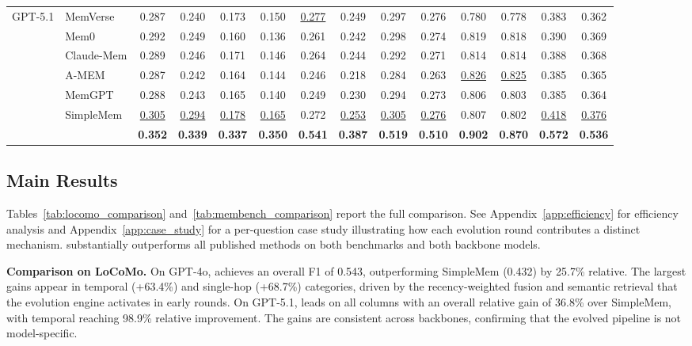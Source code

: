 \begin{table}[t]
{\begin{tabular}{ll cc cc cc cc cc cc}
\midrule
\multirow{7}{*}{GPT-5.1}
& MemVerse    & 0.287 & 0.240 & 0.173 & 0.150 & \underline{0.277} & 0.249 & 0.297 & 0.276 & 0.780 & 0.778 & 0.383 & 0.362 \\
& Mem0        & 0.292 & 0.249 & 0.160 & 0.136 & 0.261 & 0.242 & 0.298 & 0.274 & 0.819 & 0.818 & 0.390 & 0.369 \\
& Claude-Mem  & 0.289 & 0.246 & 0.171 & 0.146 & 0.264 & 0.244 & 0.292 & 0.271 & 0.814 & 0.814 & 0.388 & 0.368 \\
& A-MEM       & 0.287 & 0.242 & 0.164 & 0.144 & 0.246 & 0.218 & 0.284 & 0.263 & \underline{0.826} & \underline{0.825} & 0.385 & 0.365 \\
& MemGPT      & 0.288 & 0.243 & 0.165 & 0.140 & 0.249 & 0.230 & 0.294 & 0.273 & 0.806 & 0.803 & 0.385 & 0.364 \\
& SimpleMem   & \underline{0.305} & \underline{0.294} & \underline{0.178} & \underline{0.165} & 0.272 & \underline{0.253} & \underline{0.305} & \underline{0.276} & 0.807 & 0.802 & \underline{0.418} & \underline{0.376} \\
& \ours{}     & \textbf{0.352} & \textbf{0.339} & \textbf{0.337} & \textbf{0.350} & \textbf{0.541} & \textbf{0.387} & \textbf{0.519} & \textbf{0.510} & \textbf{0.902} & \textbf{0.870} & \textbf{0.572} & \textbf{0.536} \\
\bottomrule
\end{tabular}%
}
\vspace{-1em}
\end{table}


\subsection{Main Results}
\label{sec:main_results}

Tables~\ref{tab:locomo_comparison} and~\ref{tab:membench_comparison} report the full comparison.  See Appendix~\ref{app:efficiency} for efficiency analysis and Appendix~\ref{app:case_study} for a per-question case study illustrating how each evolution round contributes a distinct mechanism. \ours{} substantially outperforms all published methods on both benchmarks and both backbone models.

\noindent \textbf{Comparison on LoCoMo.} On GPT-4o, \ours{} achieves an overall F1 of 0.543, outperforming SimpleMem (0.432) by 25.7\% relative. The largest gains appear in temporal (+63.4\%) and single-hop (+68.7\%) categories, driven by the recency-weighted fusion and semantic retrieval that the evolution engine activates in early rounds. On GPT-5.1, \ours{} leads on all columns with an overall relative gain of 36.8\% over SimpleMem, with temporal reaching 98.9\% relative improvement. The gains are consistent across backbones, confirming that the evolved pipeline is not model-specific.




